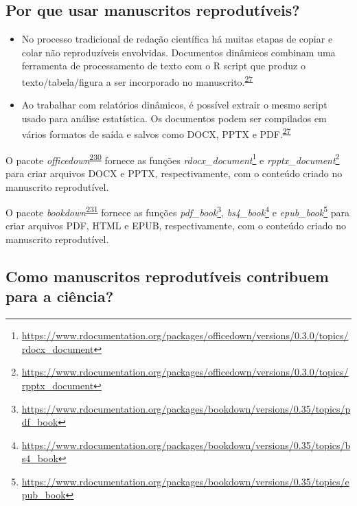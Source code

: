 \documentclass[
  a4paper,
]{book}
\renewcommand{\href}[2]{#2\footnote{\url{#1}}}
\newenvironment{infobox}[1]
  {
  \begin{itemize}
  \renewcommand{\labelitemi}{
    \raisebox{-.7\height}[0pt][0pt]{
      {\setkeys{Gin}{width=3em,keepaspectratio}
        \texttt{[image: \#1]}}
    }
  }
  \setlength{\fboxsep}{1em}
  \begin{blackbox}
  \item
  }
  {
  \end{blackbox}
  \end{itemize}
  }
\begin{document}
\hypertarget{por-que-usar-manuscritos-reprodutuxedveis}{%
\subsection{Por que usar manuscritos reprodutíveis?}\label{por-que-usar-manuscritos-reprodutuxedveis}}

\begin{itemize}
\item
  No processo tradicional de redação científica há muitas etapas de copiar e colar não reproduzíveis envolvidas. Documentos dinâmicos combinam uma ferramenta de processamento de texto com o R script que produz o texto/tabela/figura a ser incorporado no manuscrito.\textsuperscript{\protect\hyperlink{ref-mair2016}{27}}
\item
  Ao trabalhar com relatórios dinâmicos, é possível extrair o mesmo script usado para análise estatística. Os documentos podem ser compilados em vários formatos de saída e salvos como DOCX, PPTX e PDF.\textsuperscript{\protect\hyperlink{ref-mair2016}{27}}
\end{itemize}

\begin{infobox}{images/Rlogo}
O pacote \emph{officedown}\textsuperscript{\protect\hyperlink{ref-officedown}{230}} fornece as funções \href{https://www.rdocumentation.org/packages/officedown/versions/0.3.0/topics/rdocx_document}{\emph{rdocx\_document}} e \href{https://www.rdocumentation.org/packages/officedown/versions/0.3.0/topics/rpptx_document}{\emph{rpptx\_document}} para criar arquivos DOCX e PPTX, respectivamente, com o conteúdo criado no manuscrito reprodutível.

\end{infobox}

\begin{infobox}{images/Rlogo}
O pacote \emph{bookdown}\textsuperscript{\protect\hyperlink{ref-bookdown}{231}} fornece as funções \href{https://www.rdocumentation.org/packages/bookdown/versions/0.35/topics/pdf_book}{\emph{pdf\_book}}, \href{https://www.rdocumentation.org/packages/bookdown/versions/0.35/topics/bs4_book}{\emph{bs4\_book}} e \href{https://www.rdocumentation.org/packages/bookdown/versions/0.35/topics/epub_book}{\emph{epub\_book}} para criar arquivos PDF, HTML e EPUB, respectivamente, com o conteúdo criado no manuscrito reprodutível.

\end{infobox}

\hypertarget{como-manuscritos-reprodutuxedveis-contribuem-para-a-ciuxeancia}{%
\subsection{Como manuscritos reprodutíveis contribuem para a ciência?}\label{como-manuscritos-reprodutuxedveis-contribuem-para-a-ciuxeancia}}
\end{document}
